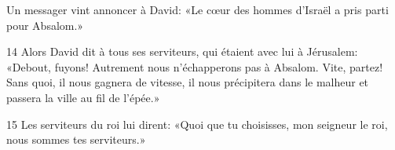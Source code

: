 Un messager vint annoncer à David: «Le cœur des hommes d’Israël a pris parti pour Absalom.»

14 Alors David dit à tous ses serviteurs, qui étaient avec lui à Jérusalem: «Debout, fuyons! Autrement nous n’échapperons pas à Absalom. Vite, partez! Sans quoi, il nous gagnera de vitesse, il nous précipitera dans le malheur et passera la ville au fil de l’épée.»

15 Les serviteurs du roi lui dirent: «Quoi que tu choisisses, mon seigneur le roi, nous sommes tes serviteurs.»
